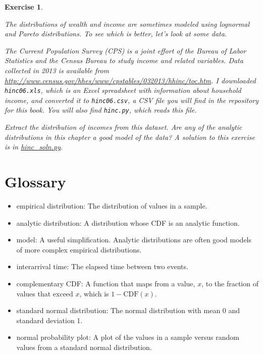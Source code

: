 \documentclass[12pt]{book}
\newcommand{\CDF}{\mathrm{CDF}}
\theoremstyle{exercise}
\newtheorem{exercise}{Exercise}[chapter]
\begin{document}
\begin{exercise}%
\label{income}

The distributions of wealth and income are sometimes modeled using
lognormal and Pareto distributions.  To see which is better, let's
look at some data.%
%
%
%

The Current Population Survey (CPS) is a joint effort of the Bureau
of Labor Statistics and the Census Bureau to study income and related
variables.  Data collected in 2013 is available from
\url{http://www.census.gov/hhes/www/cpstables/032013/hhinc/toc.htm}.
I downloaded {\tt hinc06.xls}, which is an Excel spreadsheet with
information about household income, and converted it to {\tt hinc06.csv},
a CSV file you will find in the repository for this book.  You
will also find {\tt hinc.py}, which reads this file.

Extract the distribution of incomes from this dataset.  Are any of the
analytic distributions in this chapter a good model of the data?  A
solution to this exercise is in \url{hinc_soln.py}.%

\end{exercise}




\section{Glossary}

\begin{itemize}

\item empirical distribution: The distribution of values in a sample.%
%

\item analytic distribution: A distribution whose CDF is an analytic
function.%
%

\item model: A useful simplification.  Analytic distributions are
often good models of more complex empirical distributions.%

\item interarrival time: The elapsed time between two events.%

\item complementary CDF: A function that maps from a value, $x$,
to the fraction of values that exceed $x$, which is $1 - \CDF(x)$.%
%
%

\item standard normal distribution: The normal distribution with
mean 0 and standard deviation 1.%

\item normal probability plot: A plot of the values in a sample versus
random values from a standard normal distribution.%
%

\end{itemize}
\end{document}
